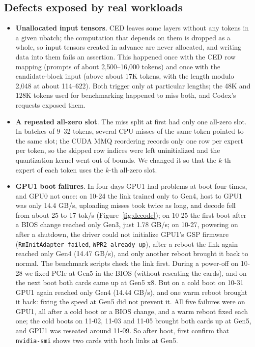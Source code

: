 \documentclass[11pt,a4paper]{article}
\newcommand{\code}[1]{\texttt{#1}}
\newcommand{\tps}{tok/s}
\begin{document}
\subsection{Defects exposed by real workloads}
\label{sec:incidents}

\begin{itemize}
  \item \textbf{Unallocated input tensors}. CED leaves some layers without any tokens in a given ubatch; the computation that depends on them is dropped as a whole, so input tensors created in advance are never allocated, and writing data into them fails an assertion. This happened once with the CED row mapping (prompts of about 2,500--16,000 tokens) and once with the candidate-block input (above about 17K tokens, with the length modulo 2,048 at about 114--622). Both trigger only at particular lengths; the 48K and 128K tokens used for benchmarking happened to miss both, and Codex's requests exposed them.
  \item \textbf{A repeated all-zero slot}. The miss split at first had only one all-zero slot. In batches of 9--32 tokens, several CPU misses of the same token pointed to the same slot; the CUDA MMQ reordering records only one row per expert per token, so the skipped row indices were left uninitialized and the quantization kernel went out of bounds. We changed it so that the $k$-th expert of each token uses the $k$-th all-zero slot.
  \item \textbf{GPU1 boot failures}. In four days GPU1 had problems at boot four times, and GPU0 not once: on 10-24 the link trained only to Gen4, host to GPU1 was only 14.4 GB/s, uploading misses took twice as long, and decode fell from about 25 to 17 \tps{} (Figure~\ref{fig:decode}); on 10-25 the first boot after a BIOS change reached only Gen3, just 1.78 GB/s; on 10-27, powering on after a shutdown, the driver could not initialize GPU1's GSP firmware (\code{RmInitAdapter failed}, \code{WPR2 already up}), after a reboot the link again reached only Gen4 (14.47 GB/s), and only another reboot brought it back to normal. The benchmark scripts check the link first. During a power-off on 10-28 we fixed PCIe at Gen5 in the BIOS (without reseating the cards), and on the next boot both cards came up at Gen5 x8. But on a cold boot on 10-31 GPU1 again reached only Gen4 (14.44 GB/s), and one warm reboot brought it back: fixing the speed at Gen5 did not prevent it. All five failures were on GPU1, all after a cold boot or a BIOS change, and a warm reboot fixed each one; the cold boots on 11-02, 11-03 and 11-05 brought both cards up at Gen5, and GPU1 was reseated around 11-09. So after boot, first confirm that \code{nvidia-smi} shows two cards with both links at Gen5.

\end{itemize}
\end{document}
